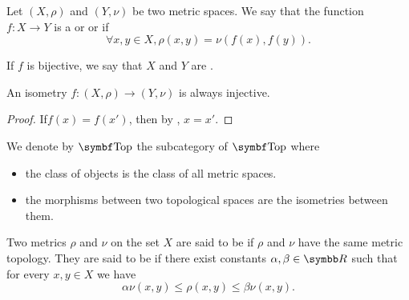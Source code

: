 \begin{definition}\label{def:isometry}\cite[253]{Engelking1989}
  Let \( (X, \rho) \) and \( (Y, \nu) \) be two metric spaces. We say that the function \( f: X \to Y \) is a  or  or  if
  \begin{equation*}
    \forall x, y \in X, \rho(x, y) = \nu(f(x), f(y)).
  \end{equation*}

  If \( f \) is bijective, we say that \( X \) and \( Y \) are .
\end{definition}

\begin{proposition}\label{def:isometry_is_injective}
  An isometry \( f: (X, \rho) \to (Y, \nu) \) is always injective.
\end{proposition}
\begin{proof}
  If\LEM \( f(x) = f(x') \), then by , \( x = x' \).
\end{proof}

\begin{definition}\label{def:category_of_metric_spaces}
  We denote by \( \Cat{Top} \) the subcategory of \( \Bold{Top} \) where
  \begin{itemize}
    \item the class of objects is the class of all metric spaces.
    \item the morphisms between two topological spaces are the isometries between them.
  \end{itemize}
\end{definition}

\begin{definition}\label{def:equivalent_metrics}
  Two metrics \( \rho \) and \( \nu \) on the set \( X \) are said to be  if \( \rho \) and \( \nu \) have the same metric topology. They are said to be  if there exist constants \( \alpha, \beta \in \BR \) such that for every \( x, y \in X \) we have
  \begin{equation*}
    \alpha \nu(x, y) \leq \rho(x, y) \leq \beta \nu(x, y).
  \end{equation*}
\end{definition}


